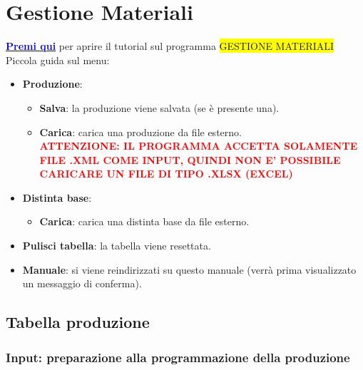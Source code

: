 \documentclass[12pt,twoside]{report}
\newcommand{\coloredbold}[2]{\textcolor{#1}{\textbf{#2}}}
\begin{document}
\chapter{Gestione Materiali}

\href{https://drive.google.com/file/d/1kBvDtx1MlKc4LtRRRGeZtYbrp9oTocNf/view?usp=sharing}{\coloredbold{blue}{Premi qui}} per aprire il tutorial sul programma \colorbox{yellow}{GESTIONE MATERIALI}\\

Piccola guida sul menu:
\begin{itemize}

	\item \textbf{Produzione}:
	
	\begin{itemize}
		\item \textbf{Salva}: la produzione viene salvata (se è presente una).
		\item \textbf{Carica}: carica una produzione da file esterno.\\
		\coloredbold{red}{ATTENZIONE: IL PROGRAMMA ACCETTA SOLAMENTE FILE .XML COME INPUT, QUINDI NON E' POSSIBILE CARICARE UN FILE DI TIPO .XLSX (EXCEL)}
	\end{itemize}

	\item \textbf{Distinta base}:
	
	\begin{itemize}
		\item \textbf{Carica}: carica una distinta base da file esterno.
	\end{itemize}

	\item \textbf{Pulisci tabella}: la tabella viene resettata.
	\item \textbf{Manuale}: si viene reindirizzati su questo manuale (verrà prima visualizzato un messaggio di conferma).

\end{itemize}


\section{Tabella produzione}

\subsection{Input: preparazione alla programmazione della produzione}
\end{document}
